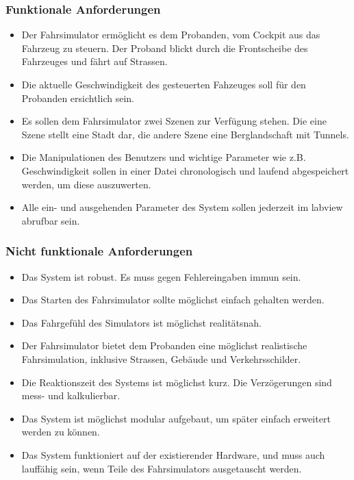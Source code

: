 \subsubsection{Funktionale Anforderungen}
\begin{itemize}
\item Der Fahrsimulator ermöglicht es dem Probanden, vom Cockpit aus das Fahrzeug zu steuern. Der Proband blickt durch die Frontscheibe des Fahrzeuges und fährt auf Strassen.
\item Die aktuelle Geschwindigkeit des gesteuerten Fahzeuges soll für den Probanden ersichtlich sein. 
\item Es sollen dem Fahrsimulator zwei Szenen zur Verfügung stehen. Die eine Szene stellt eine Stadt dar, die andere Szene eine Berglandschaft mit Tunnels.
\item Die Manipulationen des Benutzers und wichtige Parameter wie z.B. Geschwindigkeit sollen in einer Datei chronologisch und laufend abgespeichert werden, um diese auszuwerten.
\item Alle ein- und ausgehenden Parameter des System sollen jederzeit im \gls{labview} abrufbar sein.
\end{itemize}

\subsubsection {Nicht funktionale Anforderungen}
\renewcommand{\labelenumi}{\alph{enumi})}

\begin{itemize}
\item Das System ist robust. Es muss gegen Fehlereingaben immun sein. 
\item Das Starten des Fahrsimulator sollte möglichst einfach gehalten werden.
\item Das Fahrgefühl des Simulators ist möglichst realitätsnah.
\item Der Fahrsimulator bietet dem Probanden eine möglichst realistische Fahrsimulation, inklusive Strassen, Gebäude und Verkehrsschilder. 
\item Die Reaktionszeit des Systems ist möglichst kurz. Die Verzögerungen sind mess-  und kalkulierbar.
\item Das System ist möglichst modular aufgebaut, um später einfach erweitert werden zu können.
\item Das System funktioniert auf der existierender Hardware, und muss auch lauffähig sein, wenn Teile des Fahrsimulators ausgetauscht werden. 
\end{itemize}
